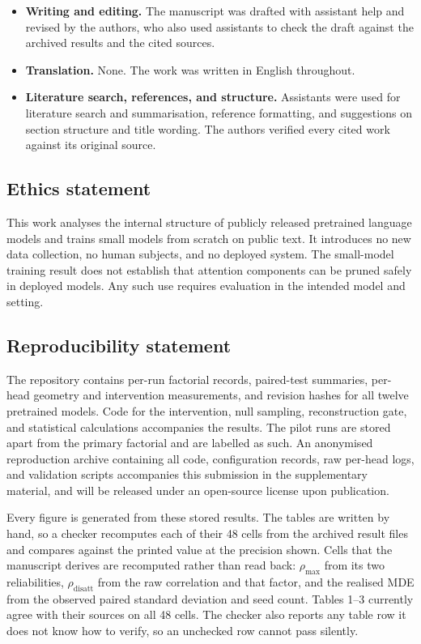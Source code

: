 \documentclass{article} %
\begin{document}
\begin{itemize}
from the stored result files. No figure content was drawn or edited by hand.
\item \textbf{Writing and editing.} The manuscript was drafted with assistant
help and revised by the authors, who also used assistants to check the draft
against the archived results and the cited sources.
\item \textbf{Translation.} None. The work was written in English throughout.
\item \textbf{Literature search, references, and structure.} Assistants were
used for literature search and summarisation, reference formatting, and
suggestions on section structure and title wording. The authors verified every
cited work against its original source.
\end{itemize}

\subsection*{Ethics statement}

This work analyses the internal structure of publicly released pretrained
language models and trains small models from scratch on public text. It
introduces no new data collection, no human subjects, and no deployed system.
The small-model training result does not establish that attention components
can be pruned safely in deployed models. Any such use requires evaluation in
the intended model and setting.

\subsection*{Reproducibility statement}

The repository contains per-run factorial records, paired-test summaries,
per-head geometry and intervention measurements, and revision hashes for all
twelve pretrained models. Code for the intervention, null sampling,
reconstruction gate, and statistical calculations accompanies the results.
The pilot runs are stored apart from the primary factorial and are labelled
as such. An anonymised reproduction archive containing all code, configuration
records, raw per-head logs, and validation scripts accompanies this submission
in the supplementary material, and will be released under an open-source license
upon publication.

Every figure is generated from these stored results. The tables are written by
hand, so a checker recomputes each of their 48 cells from the archived result
files and compares against the printed value at the precision shown. Cells
that the manuscript derives are recomputed rather than read back:
$\rho_{\max}$ from its two reliabilities, $\rho_{\text{disatt}}$ from the raw
correlation and that factor, and the realised MDE from the observed paired
standard deviation and seed count. Tables 1--3 currently agree with their
sources on all 48 cells. The checker also reports any table row it does not
know how to verify, so an unchecked row cannot pass silently.
\end{document}
